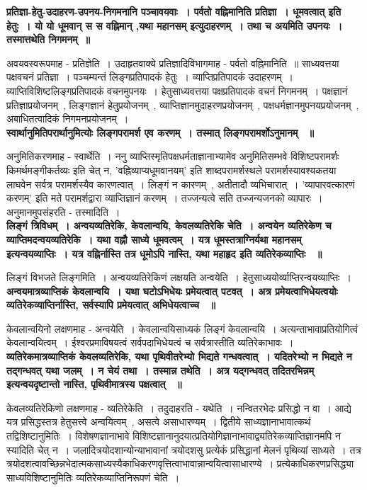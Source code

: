 	{\bfseries प्रतिज्ञा-हेतु-उदाहरण-उपनय-निगमनानि पञ्चावयवाः~। पर्वतो वह्निमानिति प्रतिज्ञा~। धूमवत्वात् इति हेतुः~। यो यो धूमवान् स स वह्निमान् ,यथा महानसम् इत्युदाहरणम्~। तथा च अयमिति उपनयः~। तस्मात्तथेति निगमनम्~॥}\par
		अवयवस्वरूपमाह - प्रतिज्ञेति~। उदाहृतवाक्ये प्रतिज्ञादिविभागमाह - पर्वतो वह्निमानिति~॥ साध्यवत्तया पक्षवचनं प्रतिज्ञा~। पञ्चम्यन्तं लिङ्गप्रतिपादकं हेतुः~। व्याप्तिप्रतिपादकं उदाहरणम्~। व्याप्तिविशिष्टलिङ्गप्रतिपादकं वचनमुपनयः~। हेतुसाध्यवत्तया पक्षप्रतिपादकं वचनं निगमनम्~। पक्षज्ञानं प्रतिज्ञाप्रयोजनम्~, लिङ्गज्ञानं हेतुप्रयोजनम्~, व्याप्तिज्ञानमुदाहरणप्रयोजनम्~, पक्षधर्मज्ञानमुपनयप्रयोजनम्~, अबाधितत्वादिकं निगमनप्रयोजनम्~।\\[10pt]
	{\bfseries स्वार्थानुमितिपरार्थानुमित्योः लिङ्गपरामर्श एव करणम्~। तस्मात् लिङ्गपरामर्शोऽनुमानम् ~॥}\par
		अनुमितिकरणमाह - स्वार्थेति~। ननु व्याप्तिस्मृतिपक्षधर्मताज्ञानाभ्यामेव अनुमितिसम्भवे विशिष्टपरामर्शः किमर्थमङ्गीकर्तव्यः इति चेत् न, ’वह्निव्याप्यधूमवानयम्’ इति शाब्दपरामर्शस्थले परामर्शस्यावश्यकतया लाघवेन सर्वत्र परामर्शस्यैव कारणत्वात्~। लिङ्गं न कारणम्~, अतीतादौ व्यभिचारात्~। ’व्यापारवत्कारणं करणम्’ इति मते परामर्शद्वारा व्याप्तिज्ञानं करणम्~। तज्जन्यत्वे सति तज्जन्यजनको व्यापारः~। अनुमानमुपसंहरति - तस्मादिति~।\\[10pt]
	{\bfseries लिङ्गं त्रिविधम्~। अन्वयव्यतिरेकि, केवलान्वयि, केवलव्यतिरेकि चेति~। अन्वयेन व्यतिरेकेण च व्याप्तिमदन्वयव्यतिरेकि~। यथा वह्नौ साध्ये धूमवत्वम्~। यत्र धूमस्तत्राग्निर्यथा महानसम् इत्यन्वयव्याप्तिः~। यत्र वह्निर्नास्ति तत्र धूमोऽपि नास्ति, यथा महाहृद इति व्यतिरेकव्याप्तिः ~॥}\par
		लिङ्गं विभजते लिङ्गमिति~। अन्वयव्यतिरेकिणं लक्षयति अन्वयेति~। हेतुसाध्ययोर्व्याप्तिरन्वयव्याप्तिः~।\\[10pt]
	{\bfseries अन्वयमात्रव्याप्तिकं केवलान्वयि~। यथा घटोऽभिधेयः प्रमेयत्वात् पटवत्~। अत्र प्रमेयत्वाभिधेयत्वयोः व्यतिरेकव्याप्तिर्नास्ति, सर्वस्यापि प्रमेयत्वात् अभिधेयत्वाच्च ~॥}\par
		केवलान्वयिनो लक्षणमाह - अन्वयेति~। केवलान्वयिसाध्यकं लिङ्गं केवलान्वयि~। अत्यन्ताभावाप्रतियोगित्वं केवलान्वयित्वम्~। ईश्वरप्रमाविषयत्वं सर्वपदाभिधेयत्वं च सर्वत्रास्तीति व्यतिरेकाभावः~।\\[10pt]
	{\bfseries व्यतिरेकमात्रव्याप्तिकं केवलव्यतिरेकि, यथा पृथिवीतरेभ्यो भिद्यते गन्धवत्वात्~। यदितरेभ्यो न भिद्यते न तद्गन्धवत् यथा जलम्~। न चेयं तथा~। तस्मान्न तथेति~। अत्र यद्गन्धवत् तदितरभिन्नम् इत्यन्वयदृष्टान्तो नास्ति, पृथिवीमात्रस्य पक्षत्वात् ~॥}\par
		केवलव्यतिरेकिणो लक्षणमाह - व्यतिरेकेति~। तदुदाहरति - यथेति~। नन्वितरभेदः प्रसिद्धो न वा~। आद्ये यत्र प्रसिद्धस्तत्र हेतुसत्त्वे अन्वयित्वम्~, असत्वे असाधारण्यम्~। द्वितीये साध्यज्ञानाभावात्कथं तद्विशिष्टानुमितिः~। विशेषणज्ञानाभावे विशिष्टज्ञानानुदयात्प्रतियोगिज्ञानाभावाद्व्यतिरेकव्याप्तिज्ञानमपि न स्यादिति चेत् न~। जलादित्रयोदशान्योन्याभावानां त्रयोदशसु प्रत्येकं प्रसिद्धानां मेलनं पृथिव्यां साध्यते~। तत्र त्रयोदशत्वावच्छिन्नभेदात्मकसाध्यस्यैकाधिकरणवृत्तित्वाभावान्नान्वयित्वासाधारण्ये~। प्रत्येकाधिकरणप्रसिद्ध्या साध्यविशिष्टानुमितिः व्यतिरेकव्याप्तिनिरूपणं चेति~।\\[10pt]
